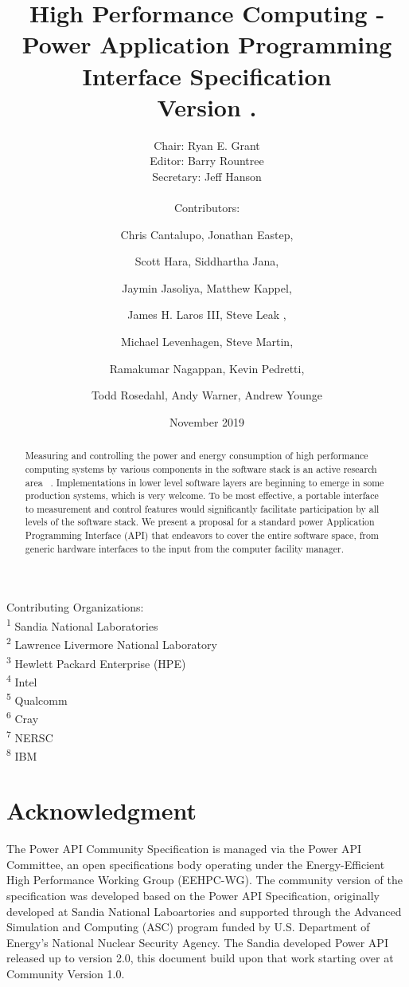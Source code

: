 \documentclass[12pt]{report}
\title{High Performance Computing - Power Application Programming Interface Specification \\ Version \majorversion.\minorversion }
\author{Chair: Ryan E. Grant\Mark{1} 
\\ Editor: Barry Rountree\Mark{2} 
\\ Secretary: Jeff Hanson\Mark{3} 
\\ \\ Contributors:  
\and Chris Cantalupo\Mark{4}, Jonathan Eastep\Mark{4}, 
\and Scott Hara\Mark{5}, Siddhartha Jana\Mark{4},\\ 
\and Jaymin Jasoliya\Mark{4}, Matthew Kappel\Mark{6}, \\ 
\and James H. Laros III\Mark{1}, Steve Leak \Mark{7}, \\ 
\and Michael Levenhagen\Mark{1}, Steve Martin\Mark{6}, \\
\and Ramakumar Nagappan\Mark{4}, Kevin Pedretti\Mark{1}, \\
\and Todd Rosedahl\Mark{8}, Andy Warner\Mark{3}, Andrew Younge\Mark{1}}
\date{November 2019}
\newcommand\Mark[1]{\textsuperscript#1}
\begin{document}
\maketitle

\noindent Contributing Organizations: \\
\Mark{1} Sandia National Laboratories \\
\Mark{2} Lawrence Livermore National Laboratory \\
\Mark{3} Hewlett Packard Enterprise (HPE) \\
\Mark{4} Intel \\
\Mark{5} Qualcomm \\
\Mark{6} Cray \\
\Mark{7} NERSC \\
\Mark{8} IBM \\


\begin{abstract}
Measuring and controlling the power and energy consumption of high performance computing systems by various components in the software stack is an active research area 
~\cite{6604474,6604496,
5488433,
Liu:2012:RCA:2318857.2254779,
Chen:2013:DSP:2561828.2561853,
Yang:2013:IDP:2503210.2503264,
Wallace:2013:CLUSTER:2503210.2503264,
Shoukourian2013,
conf:icdcn:GeorgiouCGAJH14,
Trader:2013:report:GreenComputing,
6337489,
Vishnu:2013:JSC:s11227-011-0699-9,
Mills:2013:EES:2536430.2536432,
Bertran:2013:IBM:2012.2227580,
Georgiou:2013:Bull,
6604481,
6604508}.
Implementations in lower level software layers are beginning to emerge in some production systems, which is very welcome.
To be most effective, a portable interface to measurement and control features would significantly facilitate participation by all levels of the software stack.
We present a proposal for a standard power Application Programming Interface (API) that endeavors to cover the entire software space, from generic hardware interfaces to the input from the computer facility manager.

    \end{abstract}
    \chapter{Acknowledgment}

The Power API Community Specification is managed via the Power API Committee, an open specifications body operating under the Energy-Efficient High Performance Working Group (EEHPC-WG).
The community version of the specification was developed based on the Power API Specification, originally developed at Sandia National Laboartories and supported through the Advanced Simulation and Computing (ASC) program funded by U.S. Department of Energy's National Nuclear Security Agency. The Sandia developed Power API released up to version 2.0, this document build upon that work starting over at Community Version 1.0.
\end{document}

